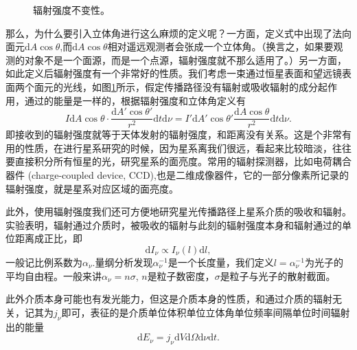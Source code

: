 \documentclass[../天体物理基础.tex]{subfiles}
\begin{document}
\begin{figure}[!htp]
\captionsetup{justification=raggedright, singlelinecheck=false}
\caption{辐射强度不变性。}
\label{辐射强度不变性。}
\end{figure}

那么，为什么要引入立体角进行这么麻烦的定义呢？一方面，定义式中出现了法向面元$\mathrm{d}A\cos\theta$,而$\mathrm{d}A\cos\theta$相对遥远观测者会张成一个立体角。（换言之，如果要观测的对象不是一个面源，而是一个点源，辐射强度就不那么适用了。）另一方面，如此定义后辐射强度有一个非常好的性质。我们考虑一束通过恒星表面和望远镜表面两个面元的光线，如图\ref{辐射强度不变性。}所示，假定传播路径没有辐射或吸收辐射的成分起作用，通过的能量是一样的，根据辐射强度和立体角定义有
\begin{equation}
I\mathrm{d}A\cos\theta\cdot\frac{\mathrm{d}A'\cos\theta'}{r^{2}}\mathrm{d}t\mathrm{d}\nu=I'\mathrm{d}A'\cos\theta'\frac{\mathrm{d}A\cos\theta}{r^{2}}\mathrm{d}t\mathrm{d}\nu.
\end{equation}
即接收到的辐射强度就等于天体发射的辐射强度，和距离没有关系。这是个非常有用的性质，在进行星系研究的时候，因为星系离我们很远，看起来比较暗淡，往往要直接积分所有恒星的光，研究星系的面亮度。常用的辐射探测器，比如电荷耦合器件 (charge-coupled device, CCD),也是二维成像器件，它的一部分像素所记录的辐射强度，就是星系对应区域的面亮度。

此外，使用辐射强度我们还可方便地研究星光传播路径上星系介质的吸收和辐射。实验表明，辐射通过介质时，被吸收的辐射与此刻的辐射强度本身和辐射通过的单位距离成正比，即
\begin{equation}
\mathrm{d}I_{\nu}\propto{}I_{\nu}\left(l\right)\mathrm{d}l,
\end{equation}
一般记比例系数为$\alpha_{\nu}$.量纲分析发现$\alpha_{\nu}^{-1}$是一个长度量，我们定义$l=\alpha_{\nu}^{-1}$为光子的平均自由程。一般来讲$\alpha_{\nu}=n\sigma$, $n$是粒子数密度，$\sigma$是粒子与光子的散射截面。

此外介质本身可能也有发光能力，但这是介质本身的性质，和通过介质的辐射无关，记其为$j_{\nu}$即可，表征的是介质单位体积单位立体角单位频率间隔单位时间辐射出的能量
\begin{equation}
\mathrm{d}E_{\nu}=j_{\nu}\mathrm{d}V\mathrm{d}\Omega\mathrm{d}\nu\mathrm{d}t.
\end{equation}
\end{document}
